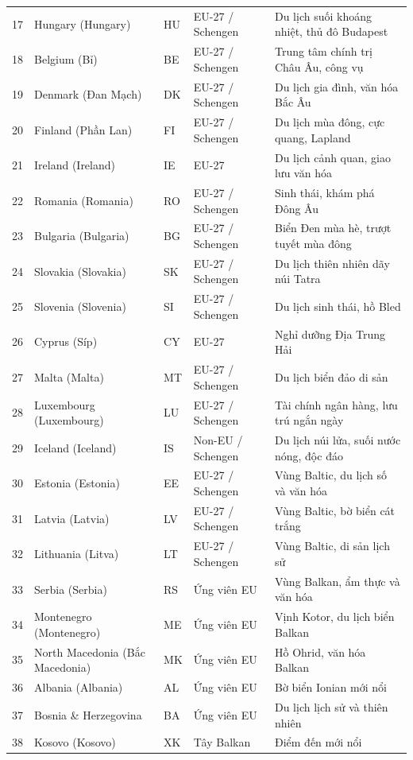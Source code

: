 \begin{table}[H]
{\begin{tabular}{cllll}
17 & Hungary (Hungary) & HU & EU-27 / Schengen & Du lịch suối khoáng nhiệt, thủ đô Budapest \\
18 & Belgium (Bỉ) & BE & EU-27 / Schengen & Trung tâm chính trị Châu Âu, công vụ \\
19 & Denmark (Đan Mạch) & DK & EU-27 / Schengen & Du lịch gia đình, văn hóa Bắc Âu \\
20 & Finland (Phần Lan) & FI & EU-27 / Schengen & Du lịch mùa đông, cực quang, Lapland \\
21 & Ireland (Ireland) & IE & EU-27 & Du lịch cảnh quan, giao lưu văn hóa \\
22 & Romania (Romania) & RO & EU-27 / Schengen & Sinh thái, khám phá Đông Âu \\
23 & Bulgaria (Bulgaria) & BG & EU-27 / Schengen & Biển Đen mùa hè, trượt tuyết mùa đông \\
24 & Slovakia (Slovakia) & SK & EU-27 / Schengen & Du lịch thiên nhiên dãy núi Tatra \\
25 & Slovenia (Slovenia) & SI & EU-27 / Schengen & Du lịch sinh thái, hồ Bled \\
26 & Cyprus (Síp) & CY & EU-27 & Nghỉ dưỡng Địa Trung Hải \\
27 & Malta (Malta) & MT & EU-27 / Schengen & Du lịch biển đảo di sản \\
28 & Luxembourg (Luxembourg) & LU & EU-27 / Schengen & Tài chính ngân hàng, lưu trú ngắn ngày \\
29 & Iceland (Iceland) & IS & Non-EU / Schengen & Du lịch núi lửa, suối nước nóng, độc đáo \\
30 & Estonia (Estonia) & EE & EU-27 / Schengen & Vùng Baltic, du lịch số và văn hóa \\
31 & Latvia (Latvia) & LV & EU-27 / Schengen & Vùng Baltic, bờ biển cát trắng \\
32 & Lithuania (Litva) & LT & EU-27 / Schengen & Vùng Baltic, di sản lịch sử \\
33 & Serbia (Serbia) & RS & Ứng viên EU & Vùng Balkan, ẩm thực và văn hóa \\
34 & Montenegro (Montenegro) & ME & Ứng viên EU & Vịnh Kotor, du lịch biển Balkan \\
35 & North Macedonia (Bắc Macedonia) & MK & Ứng viên EU & Hồ Ohrid, văn hóa Balkan \\
36 & Albania (Albania) & AL & Ứng viên EU & Bờ biển Ionian mới nổi \\
37 & Bosnia \& Herzegovina & BA & Ứng viên EU & Du lịch lịch sử và thiên nhiên \\
38 & Kosovo (Kosovo) & XK & Tây Balkan & Điểm đến mới nổi \\
\bottomrule
\end{tabular}%
}
\end{table}

